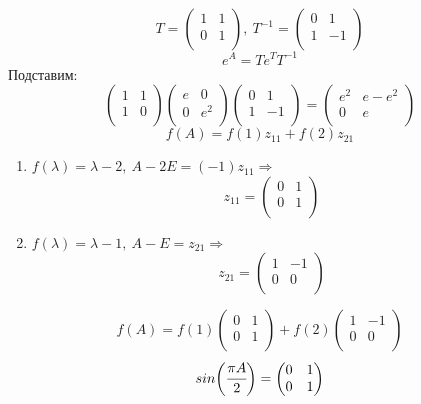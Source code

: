 \documentclass[12pt]{article}
\theoremstyle{definition}
\numberwithin{equation}{section}
\begin{document}
	\[T = \begin{pmatrix}
	1 & 1\\
	0 & 1\\
	\end{pmatrix},~T^{-1}= \begin{pmatrix}
	0 & 1\\
	1 & -1\\
	\end{pmatrix}\]
	$$e^A=Te^T T^{-1}$$
	Подставим:
	\[\begin{pmatrix}
	1 & 1\\
	1 & 0\\
	\end{pmatrix}\begin{pmatrix}
	e & 0\\
	0 & e^2\\
	\end{pmatrix}\begin{pmatrix}
	0 & 1\\
	1 & -1\\
	\end{pmatrix} = \begin{pmatrix}
	e^2 & e-e^2\\
	0 & e\\
	\end{pmatrix}\]
	$$f(A)=f(1)z_{11}+f(2)z_{21}$$
	\begin{enumerate}
		\item $f(\lambda)=\lambda-2,~A-2E=(-1)z_{11} \Rightarrow$ \[z_{11}=\begin{pmatrix}
		0 & 1\\
		0 & 1\\
		\end{pmatrix}\]
		\item $f(\lambda)=\lambda-1,~A-E=z_{21} \Rightarrow$ 
		\[z_{21}=\begin{pmatrix}
		1 & -1\\
		0 & 0\\
		\end{pmatrix}\]
	\end{enumerate}
	\[f(A)=f(1)\begin{pmatrix}
	0 & 1\\
	0 & 1\\
	\end{pmatrix}+f(2)\begin{pmatrix}
	1 & -1\\
	0 & 0\\
	\end{pmatrix}\]
	\[sin\bigg(\cfrac{\pi A}{2}\bigg) = \begin{pmatrix}
	0 & 1\\
	0 & 1\\
	\end{pmatrix}\]
\end{document}
